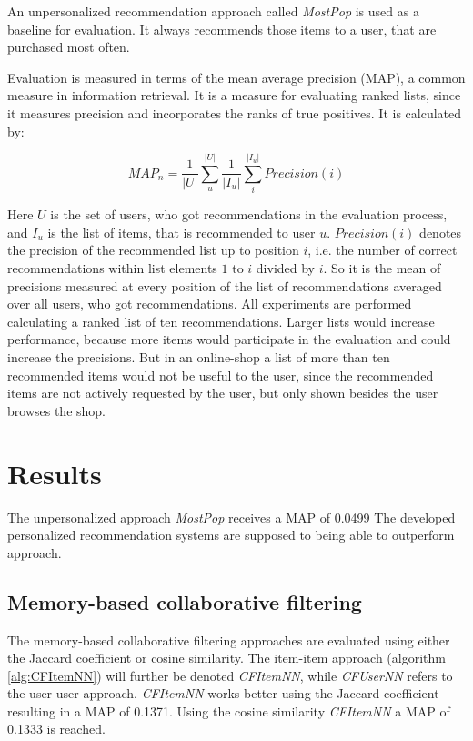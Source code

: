 \documentclass[10pt]{reportMaster}
\begin{document}
An unpersonalized recommendation approach called \textit{MostPop} is used as a baseline for evaluation.
It always recommends those items to a user, that are purchased most often.

Evaluation is measured in terms of the mean average precision (MAP), a common measure in information retrieval.
It is a measure for evaluating ranked lists, since it measures precision and incorporates the ranks of true positives.
It is calculated by:

\begin{equation}
	MAP_n = \frac{1}{|U|} \sum_u^{|U|} \frac{1}{|I_u|}\sum_i^{|I_u|} Precision(i)
\end{equation}

Here $U$ is the set of users, who got recommendations in the evaluation process, and $I_u$ is the list of items, that is recommended to user $u$.
$Precision(i)$ denotes the precision of the recommended list up to position $i$, i.e. the number of correct recommendations within list elements $1$ to $i$ divided by $i$.
So it is the mean of precisions measured at every position of the list of recommendations averaged over all users, who got recommendations.
All experiments are performed calculating a ranked list of ten recommendations.
Larger lists would increase performance, because more items would participate in the evaluation and could increase the precisions.
But in an online-shop a list of more than ten recommended items would not be useful to the user, since the recommended items are not actively requested by the user, but only shown besides the user browses the shop. 


\section{Results}
\label{sec:results}
The unpersonalized approach \textit{MostPop} receives a MAP of 0.0499
The developed personalized recommendation systems are supposed to being able to outperform approach.

\subsection{Memory-based collaborative filtering}
The memory-based collaborative filtering approaches are evaluated using either the Jaccard coefficient or cosine similarity.
The item-item approach (algorithm \ref{alg:CFItemNN}) will further be denoted \textit{CFItemNN}, while \textit{CFUserNN} refers to the user-user approach.
\textit{CFItemNN} works better using the Jaccard coefficient resulting in a MAP of 0.1371.
Using the cosine similarity \textit{CFItemNN} a MAP of 0.1333 is reached.
\end{document}
